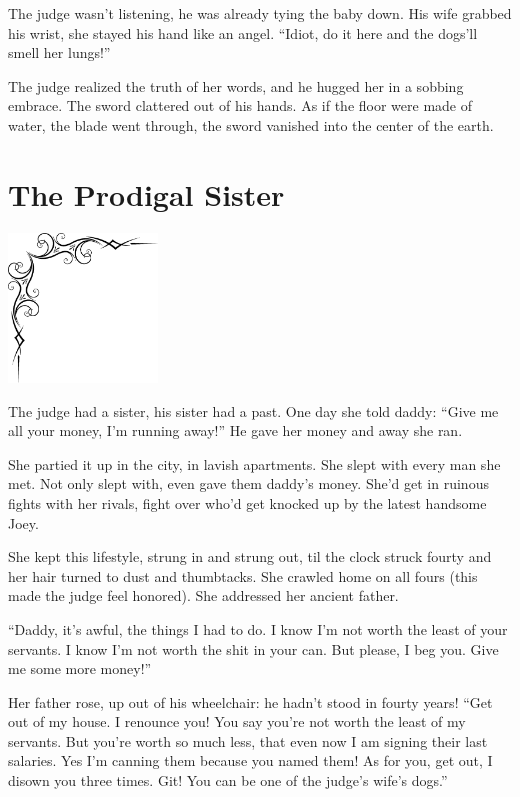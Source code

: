 \documentclass[oneside]{book}
\begin{document}
The judge wasn't listening, he was already tying the baby down.
His wife grabbed his wrist, she stayed his hand like an angel.
``Idiot, do it here and the dogs'll smell her lungs!''

The judge realized the truth of her words, and he hugged her in a sobbing embrace.
The sword clattered out of his hands.  As if the floor were made of water, the blade went
through, the sword vanished into the center of the earth.



\chapter{The Prodigal Sister}

\vspace{-2in}
\hspace{-.5in}
\includegraphics[width=150px]{ulcorner1.eps}

The judge had a sister, his sister had a past.
One day she told daddy:  ``Give me all your money,
I'm running away!''  He gave her money and away she ran.

She partied it up in the city, in lavish apartments.
She slept with every man she met.
Not only slept with, even gave them daddy's money.
She'd get in ruinous fights with her rivals, fight over
who'd get knocked up by the latest handsome Joey.

She kept this lifestyle, strung in and strung out,
til the clock struck fourty and her hair turned to dust and thumbtacks.
She crawled home on all fours (this made the judge feel honored).
She addressed
her ancient father.

``Daddy, it's awful, the things I had to do.
I know I'm not worth the least of your servants.
I know I'm not worth the shit in your can.
But please, I beg you.  Give me some more money!''

Her father rose, up out of his wheelchair:
he hadn't stood in fourty years!
``Get out of my house.  I renounce you!
You say you're not worth the least of my servants.
But you're worth so much less, that even now I am signing
their last salaries.  Yes I'm canning them because you named
them!
As for you, get out, I disown you three times.  Git!  You can be one of the judge's
wife's dogs.''
\end{document}
